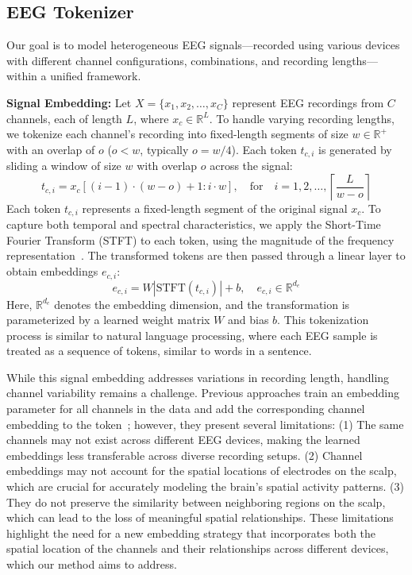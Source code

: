 \documentclass{article} %
\begin{document}
\subsection{EEG Tokenizer} \label{sec:tokenizer}
\vspace{-0.2cm}
Our goal is to model heterogeneous EEG signals—recorded using various devices with different channel configurations, combinations, and recording lengths—within a unified framework.

\textbf{Signal Embedding:} 
Let $X = \{x_1, x_2, \dots, x_C\}$ represent EEG recordings from $C$ channels, each of length $L$, where $x_c \in \mathbb{R}^{L}$. To handle varying recording lengths, we tokenize each channel's recording into fixed-length segments of size $w \in \mathbb{R}^{+}$ with an overlap of $o$ ($o < w$, typically $o = w/4$). Each token $t_{c, i}$ is generated by sliding a window of size $w$ with overlap $o$ across the signal:
\begin{equation}
t_{c, i} = x_c[(i-1) \cdot (w - o) + 1 : i \cdot w], \quad \text{for} \quad i = 1, 2, \dots, \left\lceil \frac{L}{w - o} \right\rceil
\end{equation}
Each token $t_{c, i}$ represents a fixed-length segment of the original signal $x_c$. 
To capture both temporal and spectral characteristics, we apply the Short-Time Fourier Transform (STFT) to each token, using the magnitude of the frequency representation~\citep{Biot}. The transformed tokens are then passed through a linear layer to obtain embeddings $e_{c, i}$:
\begin{equation} e_{c, i} = W \left| \text{STFT}(t_{c, i}) \right| + b, \quad e_{c, i} \in \mathbb{R}^{d_e} \end{equation}
Here, $ \mathbb{R}^{d_e} $ denotes the embedding dimension, and the transformation is parameterized by a learned weight matrix $W$ and bias $b$. This tokenization process is similar to natural language processing, where each EEG sample is treated as a sequence of tokens, similar to words in a sentence.

While this signal embedding addresses variations in recording length, handling channel variability remains a challenge. Previous approaches train an embedding parameter for all channels in the data and add the corresponding channel embedding to the token~\citep{Biot,LaBraM,EEGPT,cbramod}; however, they present several limitations: (1) The same channels may not exist across different EEG devices, making the learned embeddings less transferable across diverse recording setups. (2) Channel embeddings may not account for the spatial locations of electrodes on the scalp, which are crucial for accurately modeling the brain's spatial activity patterns. (3) They do not preserve the similarity between neighboring regions on the scalp, which can lead to the loss of meaningful spatial relationships. These limitations highlight the need for a new embedding strategy that incorporates both the spatial location of the channels and their relationships across different devices, which our method aims to address.
\end{document}
